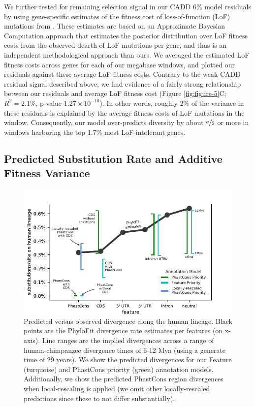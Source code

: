 \documentclass[11pt]{article}
\begin{document}
We further tested for remaining selection signal in our CADD 6\% model
residuals by using gene-specific estimates of the fitness cost of
loss-of-function (LoF) mutations from \textcite{Agarwal2023-un}. These
estimates are based on an Approximate Bayesian Computation approach that
estimates the posterior distribution over LoF fitness costs from the observed
dearth of LoF mutations per gene, and thus is an independent methodological
approach than ours. We averaged the estimated LoF fitness costs across genes
for each of our megabase windows, and plotted our residuals against these
average LoF fitness costs. Contrary to the weak CADD residual signal described
above, we find evidence of a fairly strong relationship between our residuals
and average LoF fitness cost (Figure \ref{fig:figure-5}C; $R^2 = 2.1\%$,
p-value $1.27 \times 10^{-10}$). In other words, roughly 2\% of the variance in
these residuals is explained by the average fitness costs of LoF mutations in
the window. Consequently, our model over-predicts diversity by about
$\nicefrac{\sigma}{2}$ or more in windows harboring the top 1.7\% most
LoF-intolerant genes.

\subsection*{Predicted Substitution Rate and Additive Fitness Variance}

\begin{figure}[htbp] \centering
    \includegraphics[width=\textwidth]{figures/figure_7_mod.pdf} 

    \caption{Predicted versus observed divergence along the human lineage.
        Black points are the PhyloFit divergence rate estimates per features
        (on x-axis). Line ranges are the implied divergences across a range of
        human-chimpanzee divergence times of 6-12 Mya (using a generate time of
        29 years). We show the predicted divergences for our Feature
        (turquoise) and PhastCons priority (green) annotation models.
        Additionally, we show the predicted PhastCons region divergences when
    local-rescaling is applied (we omit other locally-rescaled predictions
since these to not differ substantially).}

  \label{fig:figure-6}
\end{figure}
\end{document}
